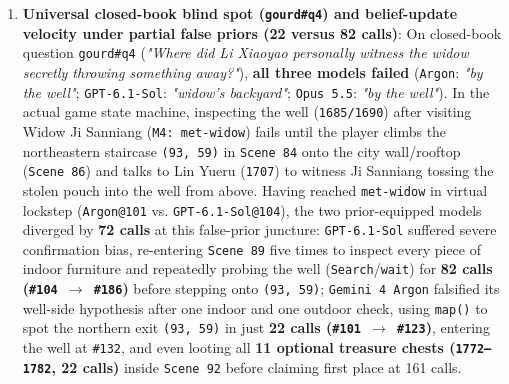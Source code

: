 \documentclass[11pt,a4paper]{article}
\begin{document}
\begin{enumerate}
\item \textbf{Universal closed-book blind spot (\texttt{gourd\#q4}) and belief-update velocity under partial false priors (22 versus 82 calls)}: On closed-book question \texttt{gourd\#q4} (\emph{"Where did Li Xiaoyao personally witness the widow secretly throwing something away?"}), \textbf{all three models failed} (\texttt{Argon}: \emph{"by the well"}; \texttt{GPT\allowbreak{}-\allowbreak{}6\allowbreak{}.\allowbreak{}1\allowbreak{}-\allowbreak{}Sol}: \emph{"widow's backyard"}; \texttt{Opus\allowbreak{} \allowbreak{}5\allowbreak{}.\allowbreak{}5}: \emph{"by the well"}). In the actual game state machine, inspecting the well (\texttt{1685\allowbreak{}/\allowbreak{}1690}) after visiting Widow Ji Sanniang (\texttt{M4\allowbreak{}:\allowbreak{} \allowbreak{}met\allowbreak{}-\allowbreak{}widow}) fails until the player climbs the northeastern staircase \texttt{(93\allowbreak{},\allowbreak{} \allowbreak{}59)} in \texttt{Scene\allowbreak{} \allowbreak{}84} onto the city wall/rooftop (\texttt{Scene\allowbreak{} \allowbreak{}86}) and talks to Lin Yueru (\texttt{1707}) to witness Ji Sanniang tossing the stolen pouch into the well from above. Having reached \texttt{met\allowbreak{}-\allowbreak{}widow} in virtual lockstep (\texttt{Argon@101} vs. \texttt{GPT\allowbreak{}-\allowbreak{}6\allowbreak{}.\allowbreak{}1\allowbreak{}-\allowbreak{}Sol@104}), the two prior-equipped models diverged by \textbf{72 calls} at this false-prior juncture: \texttt{GPT\allowbreak{}-\allowbreak{}6\allowbreak{}.\allowbreak{}1\allowbreak{}-\allowbreak{}Sol} suffered severe confirmation bias, re-entering \texttt{Scene\allowbreak{} \allowbreak{}89} five times to inspect every piece of indoor furniture and repeatedly probing the well (\texttt{Search}/\texttt{wait}) for \textbf{82 calls (\texttt{\#104\allowbreak{} \allowbreak{}\ensuremath{\rightarrow}\allowbreak{} \allowbreak{}\#186})} before stepping onto \texttt{(93\allowbreak{},\allowbreak{} \allowbreak{}59)}; \texttt{Gemini\allowbreak{} \allowbreak{}4\allowbreak{} \allowbreak{}Argon} falsified its well-side hypothesis after one indoor and one outdoor check, using \texttt{map()} to spot the northern exit \texttt{(93\allowbreak{},\allowbreak{} \allowbreak{}59)} in just \textbf{22 calls (\texttt{\#101\allowbreak{} \allowbreak{}\ensuremath{\rightarrow}\allowbreak{} \allowbreak{}\#123})}, entering the well at \texttt{\#132}, and even looting all \textbf{11 optional treasure chests (\texttt{1772--1782}, 22 calls)} inside \texttt{Scene\allowbreak{} \allowbreak{}92} before claiming first place at 161 calls.

\end{enumerate}
\end{document}
